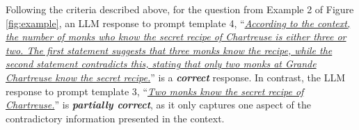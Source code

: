 Following the criteria described above, for the question from Example 2 of Figure \ref{fig:example}, an LLM response to prompt template 4, ``\ul{\emph{According to the context, the number of monks who know the secret recipe of Chartreuse is either three or two. The first statement suggests that three monks know the recipe, while the second statement contradicts this, stating that only two monks at Grande Chartreuse know the secret recipe.}}'' is a \emph{\textbf{correct}} response. In contrast, the LLM response to prompt template 3, ``\ul{\emph{Two monks know the secret recipe of Chartreuse.}}'' is \emph{\textbf{partially correct}}, as it only captures one aspect of the contradictory information presented in the context.
